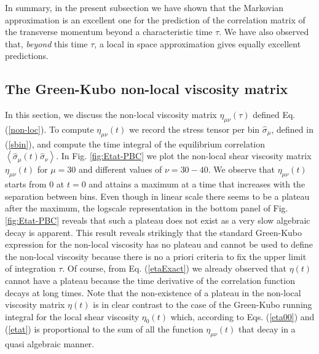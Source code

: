 \documentclass[a4paper,openright,12pt]{book}
\newcommand{\llangle}{\left\langle}
\newcommand{\rrangle}{\right\rangle}
\begin{document}
In summary, in the present subsection we have shown that the Markovian
approximation  is  an   excellent  one  for  the   prediction  of  the
correlation matrix of the  transverse momentum beyond a characteristic
time $\tau$.   We have also  observed that, \textit{beyond}  this time
$\tau$,  a  local  in  space  approximation  gives  equally  excellent
predictions.




\subsection{The Green-Kubo non-local viscosity matrix}
In   this  section,   we  discuss   the  non-local   viscosity  matrix
$\eta_{\mu\nu}(\tau)$  defined   Eq.   (\ref{non-loc}).    To  compute
$\eta_{\mu\nu}(t)$   we    record   the   stress   tensor    per   bin
$\hat{\sigma}_\mu$,  defined in  (\ref{sbin}),  and  compute the  time
integral     of     the      equilibrium     correlation     $\llangle
\hat{\sigma}_{\mu}(t)\hat{\sigma}_\nu\rrangle$.         In        Fig.
\ref{fig:Etat-PBC}  we  plot  the non-local  shear  viscosity
matrix  $\eta_{\mu\nu}(t)$  for  $\mu=30$   and  different  values  of
$\nu=30-40$.   We observe  that  $\eta_{\mu\nu}(t)$ starts  from 0  at
$t=0$  and  attains a  maximum  at  a  time  that increases  with  the
separation between bins. Even though in linear scale there seems to be
a plateau after the maximum, the logscale representation in the bottom
panel of Fig.  \ref{fig:Etat-PBC} reveals that such a plateau
does  not exist  as a  very slow  algebraic decay  is apparent.   This
result reveals strikingly that  the standard Green-Kubo expression for
the non-local  viscosity has no plateau  and cannot be used  to define
the non-local viscosity  because there is no a priori  criteria to fix
the  upper  limit   of  integration  $\tau$.   Of   course,  from  Eq.
(\ref{etaExact})  we already  observed  that $\eta(t)$  cannot have  a
plateau because the time derivative of the correlation function decays
at  long times.   Note  that the  non-existence of  a  plateau in  the
non-local viscosity matrix $\eta(t)$ is  in clear contrast to the case
of  the Green-Kubo  running  integral for  the  local shear  viscosity
$\eta_0(t)$ which,  according to Eqs.  (\ref{eta00})  and (\ref{etat})
is proportional to the sum of all the function $\eta_{\mu\nu}(t)$ that
decay  in a  quasi  algebraic  manner. 
\end{document}
